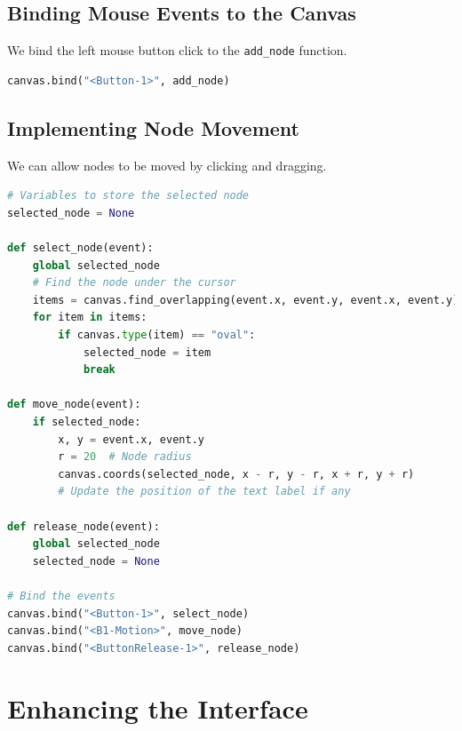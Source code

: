 \documentclass{article}
\begin{document}
\subsection{Binding Mouse Events to the Canvas}

We bind the left mouse button click to the \texttt{add\_node} function.

\begin{lstlisting}[language=Python]
canvas.bind("<Button-1>", add_node)
\end{lstlisting}

\subsection{Implementing Node Movement}

We can allow nodes to be moved by clicking and dragging.

\begin{lstlisting}[language=Python]
# Variables to store the selected node
selected_node = None

def select_node(event):
    global selected_node
    # Find the node under the cursor
    items = canvas.find_overlapping(event.x, event.y, event.x, event.y)
    for item in items:
        if canvas.type(item) == "oval":
            selected_node = item
            break

def move_node(event):
    if selected_node:
        x, y = event.x, event.y
        r = 20  # Node radius
        canvas.coords(selected_node, x - r, y - r, x + r, y + r)
        # Update the position of the text label if any

def release_node(event):
    global selected_node
    selected_node = None

# Bind the events
canvas.bind("<Button-1>", select_node)
canvas.bind("<B1-Motion>", move_node)
canvas.bind("<ButtonRelease-1>", release_node)
\end{lstlisting}

\section{Enhancing the Interface}
\end{document}
